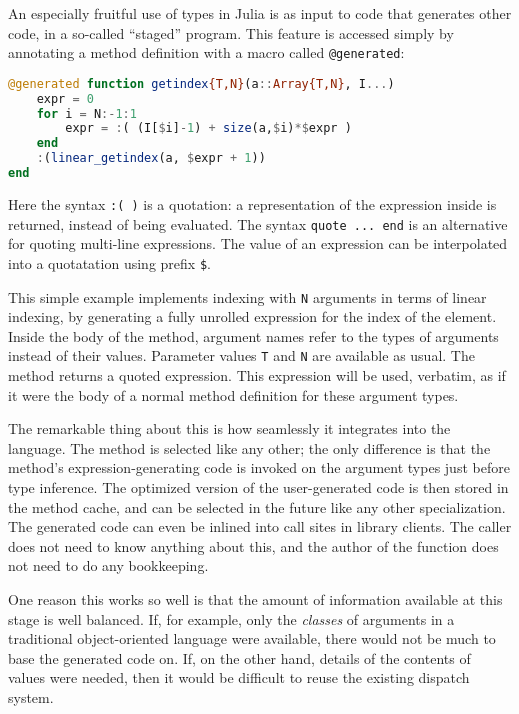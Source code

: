 An especially fruitful use of types in Julia is as input to code that
generates other code, in a so-called ``staged'' program.
This feature is accessed simply by annotating a method definition
with a macro called \texttt{@generated}:

\begin{singlespace}
\begin{lstlisting}[language=julia]
@generated function getindex{T,N}(a::Array{T,N}, I...)
    expr = 0
    for i = N:-1:1
        expr = :( (I[$i]-1) + size(a,$i)*$expr )
    end
    :(linear_getindex(a, $expr + 1))
end
\end{lstlisting}
\end{singlespace}

\noindent
Here the syntax \texttt{:(  )} is a quotation: a representation of the
expression inside is returned, instead of being evaluated.
The syntax \texttt{quote ... end} is an alternative for quoting multi-line
expressions.
The value of an expression can be interpolated into a quotatation using
prefix \texttt{\$}.


This simple example implements indexing with \texttt{N} arguments
in terms of linear indexing, by generating a fully unrolled expression
for the index of the element.
Inside the body of the method, argument names refer to the types of
arguments instead of their values.
Parameter values \texttt{T} and \texttt{N} are available as usual.
The method returns a quoted expression.
This expression will be used, verbatim, as if it were the body of
a normal method definition for these argument types.

The remarkable thing about this is how seamlessly it integrates into
the language.
The method is selected like any other; the only difference is that
the method's expression-generating code is invoked on the argument types
just before type inference.
The optimized version of the user-generated code is then stored in the method
cache, and can be selected in the future like any other specialization.
The generated code can even be inlined into call sites in library clients.
The caller does not need to know anything about this, and the author
of the function does not need to do any bookkeeping.

One reason this works so well is that the amount of information
available at this stage is well balanced.
If, for example, only the \emph{classes} of arguments in a traditional
object-oriented language were available, there would not be much
to base the generated code on.
If, on the other hand, details of the contents of values were needed,
then it would be difficult to reuse the existing dispatch system.

